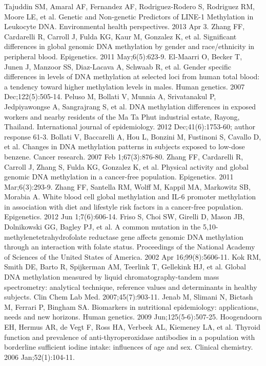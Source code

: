 \begin{thebibliography}{12}
		Tajuddin SM, Amaral AF, Fernandez AF, Rodriguez-Rodero S, Rodriguez RM, Moore LE, et al. Genetic and Non-genetic Predictors of LINE-1 Methylation in Leukocyte DNA. Environmental health perspectives. 2013 Apr 3. 
		Zhang FF, Cardarelli R, Carroll J, Fulda KG, Kaur M, Gonzalez K, et al. Significant differences in global genomic DNA methylation by gender and race/ethnicity in peripheral blood. Epigenetics. 2011 May;6(5):623-9. 
		El-Maarri O, Becker T, Junen J, Manzoor SS, Diaz-Lacava A, Schwaab R, et al. Gender specific differences in levels of DNA methylation at selected loci from human total blood: a tendency toward higher methylation levels in males. Human genetics. 2007 Dec;122(5):505-14. 
		Peluso M, Bollati V, Munnia A, Srivatanakul P, Jedpiyawongse A, Sangrajrang S, et al. DNA methylation differences in exposed workers and nearby residents of the Ma Ta Phut industrial estate, Rayong, Thailand. International journal of epidemiology. 2012 Dec;41(6):1753-60; author response 61-3. 
		Bollati V, Baccarelli A, Hou L, Bonzini M, Fustinoni S, Cavallo D, et al. Changes in DNA methylation patterns in subjects exposed to low-dose benzene. Cancer research. 2007 Feb 1;67(3):876-80. 
		Zhang FF, Cardarelli R, Carroll J, Zhang S, Fulda KG, Gonzalez K, et al. Physical activity and global genomic DNA methylation in a cancer-free population. Epigenetics. 2011 Mar;6(3):293-9. 
		Zhang FF, Santella RM, Wolff M, Kappil MA, Markowitz SB, Morabia A. White blood cell global methylation and IL-6 promoter methylation in association with diet and lifestyle risk factors in a cancer-free population. Epigenetics. 2012 Jun 1;7(6):606-14. 
		Friso S, Choi SW, Girelli D, Mason JB, Dolnikowski GG, Bagley PJ, et al. A common mutation in the 5,10-methylenetetrahydrofolate reductase gene affects genomic DNA methylation through an interaction with folate status. Proceedings of the National Academy of Sciences of the United States of America. 2002 Apr 16;99(8):5606-11. 
		Kok RM, Smith DE, Barto R, Spijkerman AM, Teerlink T, Gellekink HJ, et al. Global DNA methylation measured by liquid chromatography-tandem mass spectrometry: analytical technique, reference values and determinants in healthy subjects. Clin Chem Lab Med. 2007;45(7):903-11. 
		Jenab M, Slimani N, Bictash M, Ferrari P, Bingham SA. Biomarkers in nutritional epidemiology: applications, needs and new horizons. Human genetics. 2009 Jun;125(5-6):507-25. 
		Hoogendoorn EH, Hermus AR, de Vegt F, Ross HA, Verbeek AL, Kiemeney LA, et al. Thyroid function and prevalence of anti-thyroperoxidase antibodies in a population with borderline sufficient iodine intake: influences of age and sex. Clinical chemistry. 2006 Jan;52(1):104-11. 

\end{thebibliography}
